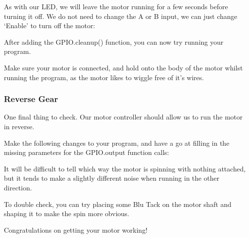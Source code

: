 		
		
		As with our LED, we will leave the motor running for a few seconds before turning it off. We do not need to change the A or B input, we can just change `Enable' to turn off the motor:
		
		
		
		After adding the GPIO.cleanup() function, you can now try running your program.
		
		Make sure your motor is connected, and hold onto the body of the motor whilst running the program, as the motor likes to wiggle free of it's wires.
		
		\subsubsection*{Reverse Gear}
		
			One final thing to check. Our motor controller should allow us to run the motor in reverse. 
			
			Make the following changes to your program, and have a go at filling in the missing parameters for the GPIO.output function calls:
					
			
			
			It will be difficult to tell which way the motor is spinning with nothing attached, but it tends to make a slightly different noise when running in the other direction.
			
			To double check, you can try placing some Blu Tack on the motor shaft and shaping it to make the spin more obvious.
			
			Congratulations on getting your motor working!
			